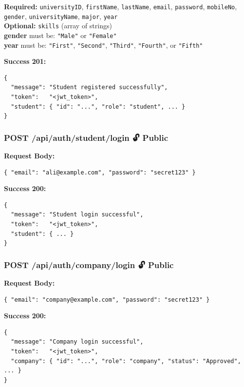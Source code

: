 \documentclass[12pt,a4paper]{article}
\begin{document}
\textbf{Required:} \texttt{universityID}, \texttt{firstName}, \texttt{lastName}, \texttt{email}, \texttt{password}, \texttt{mobileNo}, \texttt{gender}, \texttt{universityName}, \texttt{major}, \texttt{year}\\
\textbf{Optional:} \texttt{skills} (array of strings)\\
\textbf{gender} must be: \texttt{"Male"} or \texttt{"Female"}\\
\textbf{year} must be: \texttt{"First"}, \texttt{"Second"}, \texttt{"Third"}, \texttt{"Fourth"}, or \texttt{"Fifth"}

\textbf{Success 201:}
\begin{lstlisting}[language={}]
{
  "message": "Student registered successfully",
  "token":   "<jwt_token>",
  "student": { "id": "...", "role": "student", ... }
}
\end{lstlisting}

\vspace{0.5cm}

\subsubsection*{POST /api/auth/student/login \quad 🔓 Public}

\textbf{Request Body:}
\begin{lstlisting}[language={}]
{ "email": "ali@example.com", "password": "secret123" }
\end{lstlisting}

\textbf{Success 200:}
\begin{lstlisting}[language={}]
{
  "message": "Student login successful",
  "token":   "<jwt_token>",
  "student": { ... }
}
\end{lstlisting}

\vspace{0.5cm}

\subsubsection*{POST /api/auth/company/login \quad 🔓 Public}

\textbf{Request Body:}
\begin{lstlisting}[language={}]
{ "email": "company@example.com", "password": "secret123" }
\end{lstlisting}

\textbf{Success 200:}
\begin{lstlisting}[language={}]
{
  "message": "Company login successful",
  "token":   "<jwt_token>",
  "company": { "id": "...", "role": "company", "status": "Approved", ... }
}
\end{lstlisting}
\end{document}
